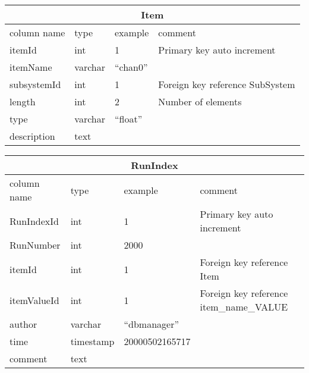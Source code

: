 \begin{slide*}
\begin{table}[htbp]
\begin{center}
\begin{tabular}{|l|l|l|l|} \hline
\multicolumn{4}{|c|}{Item} \\ \hline
column name & type & example & comment \\ \hline\hline
itemId      & int     & 1         & Primary key auto increment\\
itemName    & varchar & ``chan0''   & \\
subsystemId & int     & 1         & Foreign key reference SubSystem\\
length      & int     & 2         & Number of elements\\
type        & varchar & ``float'' & \\
description & text    &           & \\ \hline
\end{tabular}
\end{center}
\end{table}


\begin{table}[htbp]
\begin{center}
\begin{tabular}{|l|l|l|l|} \hline
\multicolumn{4}{|c|}{RunIndex} \\ \hline
column name & type & example & comment\\ \hline\hline
RunIndexId     & int        & 1       & Primary key auto increment\\
RunNumber      & int        & 2000   &  \\
itemId         & int        & 1       & Foreign key reference Item\\
itemValueId    & int        & 1       & Foreign key reference item\_name\_VALUE\\
author         & varchar     & ``dbmanager''            & \\
time           & timestamp  & 20000502165717        & \\ 
comment        & text       &                       & \\ \hline
\end{tabular}
\end{center}
\end{table}



\end{slide*}
